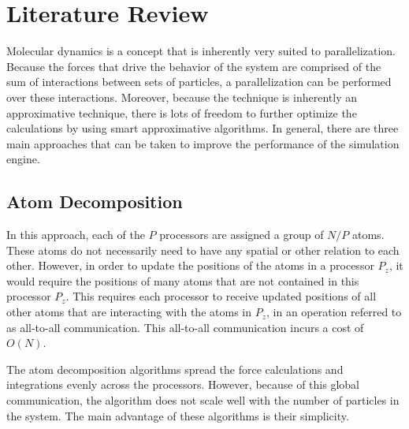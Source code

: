 \documentclass[conference]{IEEEtran}
\begin{document}
\section{Literature Review}
    Molecular dynamics is a concept that is inherently very suited to parallelization. Because the forces that
    drive the behavior of the system are comprised of the sum of interactions between sets of particles, a parallelization
    can be performed over these interactions. Moreover, because the technique is inherently an approximative technique,
    there is lots of freedom to further optimize the calculations by using smart approximative algorithms. 
    In general, there are three main approaches that can be taken to improve the performance of the
    simulation engine. 

    \subsection{Atom Decomposition}
    In this approach, each of the $P$ processors are assigned a group of $N/P$ atoms. These atoms do not necessarily
    need to have any spatial or other relation to each other. However, in order to update the positions of the atoms
    in a processor $P_z$, it would require the positions of many atoms that are not contained in this processor
    $P_z$. This requires each processor to receive updated positions of all other atoms that are interacting with
    the atoms in $P_z$, in an operation referred to as all-to-all communication. This all-to-all communication incurs
    a cost of $O(N)$.~\cite{plimpton1995fast, fox1989solving}
    
    The atom decomposition algorithms
    spread the force calculations and integrations evenly across the processors. However, because of this global
    communication, the algorithm does not scale well with the number of particles in the system. The main advantage
    of these algorithms is their simplicity.~\cite{plimpton1995fast, fox1989solving}
\end{document}
